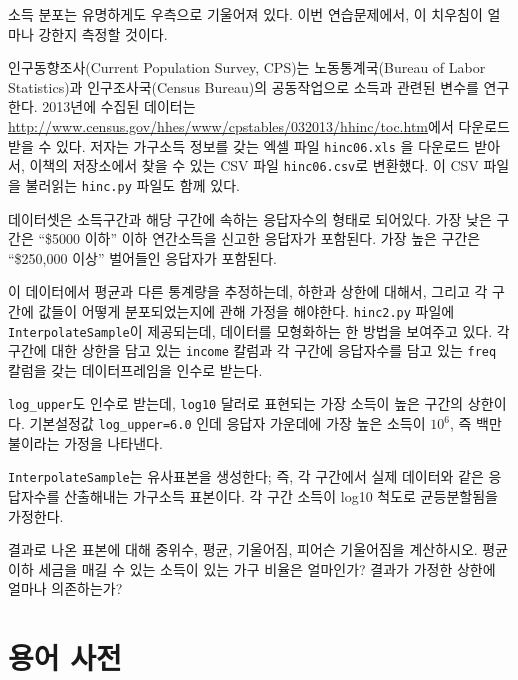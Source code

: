 \begin{exercise}

소득 분포는 유명하게도 우측으로 기울어져 있다.
이번 연습문제에서, 이 치우침이 얼마나 강한지 측정할 것이다.

인구동향조사(Current Population Survey, CPS)는 노동통계국(Bureau of Labor Statistics)과 
인구조사국(Census Bureau)의 공동작업으로 소득과 관련된 변수를 연구한다.
2013년에 수집된 데이터는 \url{http://www.census.gov/hhes/www/cpstables/032013/hhinc/toc.htm}에서 다운로드 받을 수 있다.
저자는 가구소득 정보를 갖는 엑셀 파일 {\tt hinc06.xls} 을 다운로드 받아서,
이책의 저장소에서 찾을 수 있는 CSV 파일 {\tt hinc06.csv}로 변환했다.
이 CSV 파일을 불러읽는 {\tt hinc.py} 파일도 함께 있다.


데이터셋은 소득구간과 해당 구간에 속하는 응답자수의 형태로 되어있다.
가장 낮은 구간은 ``\$5000 이하'' 이하 연간소득을 신고한 응답자가 포함된다.
가장 높은 구간은 ``\$250,000 이상'' 벌어들인 응답자가 포함된다.

이 데이터에서 평균과 다른 통계량을 추정하는데, 하한과 상한에 대해서, 그리고 각 구간에
값들이 어떻게 분포되었는지에 관해 가정을 해야한다.
{\tt hinc2.py} 파일에 {\tt InterpolateSample}이 제공되는데,
데이터를 모형화하는 한 방법을 보여주고 있다.
각 구간에 대한 상한을 담고 있는 {\tt income} 칼럼과 
각 구간에 응답자수를 담고 있는 {\tt freq} 칼럼을 갖는 데이터프레임을 인수로 받는다.

\verb"log_upper"도 인수로 받는데, {\tt log10} 달러로 표현되는 가장 소득이 높은 구간의 상한이다.
기본설정값 \verb"log_upper=6.0" 인데 응답자 가운데에 가장 높은 소득이 $10^6$, 즉 백만불이라는 
가정을 나타낸다.

{\tt InterpolateSample}는 유사표본을 생성한다; 즉,
각 구간에서 실제 데이터와 같은 응답자수를 산출해내는 가구소득 표본이다.
각 구간 소득이 log10 척도로 균등분할됨을 가정한다.

결과로 나온 표본에 대해 중위수, 평균, 기울어짐, 피어슨 기울어짐을 계산하시오.
평균이하 세금을 매길 수 있는 소득이 있는 가구 비율은 얼마인가?
결과가 가정한 상한에 얼마나 의존하는가?

\end{exercise}


\section{용어 사전}

